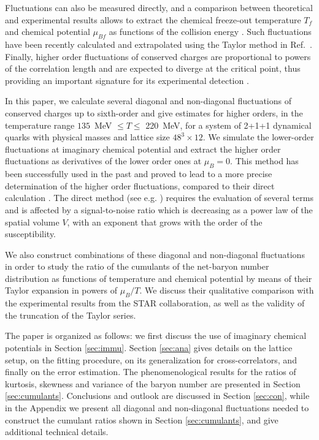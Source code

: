\documentclass[a4paper,11pt]{article}
\begin{document}
Fluctuations can also be measured directly, and a comparison between
theoretical and experimental results allows to extract the chemical freeze-out
temperature $T_f$ and chemical potential $\mu_{Bf}$ as functions of the
collision energy
\cite{Karsch:2012wm,Bazavov:2012vg,Borsanyi:2013hza,Borsanyi:2014ewa,Ratti:2018ksb}. Such fluctuations have been recently calculated and extrapolated
using the Taylor method in Ref.~\cite{Bazavov:2017tot}.
Finally, higher order fluctuations of conserved charges are proportional to
powers of the correlation length and are expected to diverge at the critical
point, thus providing an important signature for its experimental detection
\cite{Gavai:2008zr,Stephanov:1999zu,Cheng:2007jq}.

In this paper, we calculate several diagonal and non-diagonal fluctuations of
conserved charges up to sixth-order and give estimates for higher orders,
in the temperature range $135$~MeV $\leq T\leq$ 220~MeV,
for a system of 2+1+1 dynamical quarks with physical masses and
lattice size $48^3\times12$. We simulate the lower-order fluctuations at
imaginary chemical potential and extract the higher order fluctuations as
derivatives of the lower order ones at $\mu_B=0$. This method has been
successfully used in the past and proved to lead to a more precise
determination of the higher order fluctuations, compared to their direct
calculation \cite{Gunther:2016vcp,DElia:2016jqh}. The direct method (see e.g. \cite{Allton:2002zi})
requires the evaluation of several terms and is affected by a signal-to-noise
ratio which is decreasing as a power law of the spatial volume $V$,  with an
exponent that grows with the order of the susceptibility. 

We also construct combinations of these diagonal and non-diagonal fluctuations
in order to study the ratio of the cumulants of the net-baryon number
distribution as functions of temperature and chemical potential by means of
their Taylor expansion in powers of $\mu_B/T$. We discuss their qualitative
comparison with the experimental results from the STAR collaboration, as well
as the validity of the truncation of the Taylor series.

The paper is organized as follows: we first discuss the use of imaginary
chemical potentials in Section \ref{sec:immu}. Section \ref{sec:ana}
gives details on the lattice setup, on the fitting procedure, on its
generalization for cross-correlators, and finally on the error estimation.
The phenomenological results for the ratios of kurtosis, skewness and variance
of the baryon number are presented in Section \ref{sec:cumulants}.
Conclusions and outlook are discussed in Section \ref{sec:con}, 
while in the Appendix we present all
diagonal and non-diagonal fluctuations needed to construct the cumulant ratios
shown in Section \ref{sec:cumulants}, and give additional technical details.
\end{document}
